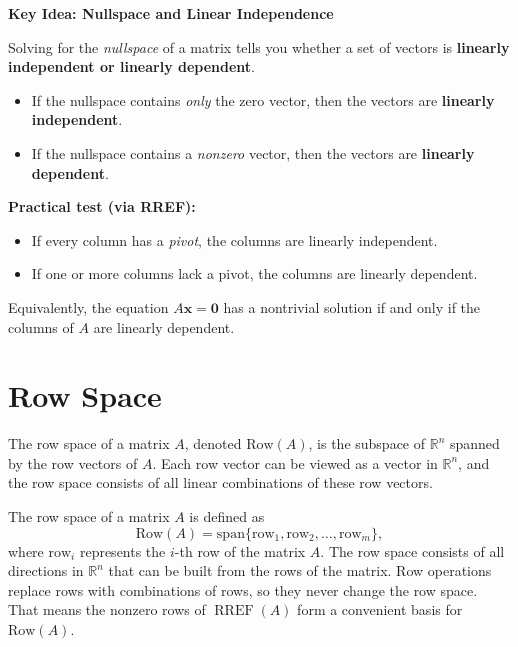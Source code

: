 \begin{mdframed}
\textbf{Key Idea: Nullspace and Linear Independence}

Solving for the \emph{nullspace} of a matrix tells you whether a set of vectors is
\textbf{linearly independent or linearly dependent}.

\begin{itemize}
    \item If the nullspace contains \emph{only} the zero vector, then the vectors are
    \textbf{linearly independent}.
    \item If the nullspace contains a \emph{nonzero} vector, then the vectors are
    \textbf{linearly dependent}.
\end{itemize}

\medskip
\textbf{Practical test (via RREF):}
\begin{itemize}
    \item If every column has a \emph{pivot}, the columns are linearly independent.
    \item If one or more columns lack a pivot, the columns are linearly dependent.
\end{itemize}

Equivalently, the equation \(A\mathbf{x}=\mathbf{0}\) has a nontrivial solution
if and only if the columns of \(A\) are linearly dependent.
\end{mdframed}

\section{Row Space}
The row space of a matrix $A$, denoted $\text{Row}(A)$, is the subspace of $\mathbb{R}^n$ spanned by the row vectors of $A$. Each row vector can be viewed as a vector in $\mathbb{R}^n$, and the row space consists of all linear combinations of these row vectors.

\begin{mdframed}[frametitle = {Row Space}, style = important]
The row space of a matrix $A$ is defined as
\[\text{Row}(A) = \text{span}\{\text{row}_1, \text{row}_2, \ldots, \text{row}_m\},\]
where $\text{row}_i$ represents the $i$-th row of the matrix $A$.
The row space consists of all directions in $\mathbb{R}^n$ that can be built from the rows of the matrix.
Row operations replace rows with combinations of rows, so they never
change the row space. That means the nonzero rows of $\operatorname{RREF}(A)$
form a convenient basis for $\text{Row}(A)$.
\end{mdframed}

